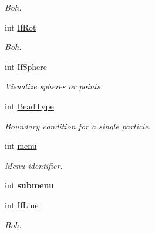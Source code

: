 \begin{DoxyCompactItemize}
\begin{DoxyCompactList}\small\item\em \-Boh. \end{DoxyCompactList}\item 
\hypertarget{classForces_a2c1a353b3d35ac1fdcc12aca81f6bb9d}{int \hyperlink{classForces_a2c1a353b3d35ac1fdcc12aca81f6bb9d}{\-If\-Rot}}\label{classForces_a2c1a353b3d35ac1fdcc12aca81f6bb9d}

\begin{DoxyCompactList}\small\item\em \-Boh. \end{DoxyCompactList}\item 
\hypertarget{classForces_a49498134a2a543fdb43ec67e5dca8e37}{int \hyperlink{classForces_a49498134a2a543fdb43ec67e5dca8e37}{\-If\-Sphere}}\label{classForces_a49498134a2a543fdb43ec67e5dca8e37}

\begin{DoxyCompactList}\small\item\em \-Visualize spheres or points. \end{DoxyCompactList}\item 
\hypertarget{classForces_a06476a36da66d85ccb8de14d0275474d}{int \hyperlink{classForces_a06476a36da66d85ccb8de14d0275474d}{\-Bead\-Type}}\label{classForces_a06476a36da66d85ccb8de14d0275474d}

\begin{DoxyCompactList}\small\item\em \-Boundary condition for a single particle. \end{DoxyCompactList}\item 
\hypertarget{classForces_a26b42906c0869d0cef7431a39a162950}{int \hyperlink{classForces_a26b42906c0869d0cef7431a39a162950}{menu}}\label{classForces_a26b42906c0869d0cef7431a39a162950}

\begin{DoxyCompactList}\small\item\em \-Menu identifier. \end{DoxyCompactList}\item 
\hypertarget{classForces_af6060165f2c5013a4339818e9c08833d}{int {\bfseries submenu}}\label{classForces_af6060165f2c5013a4339818e9c08833d}

\item 
\hypertarget{classForces_ac3e70209b515c8a6293fcdb019a2fb29}{int \hyperlink{classForces_ac3e70209b515c8a6293fcdb019a2fb29}{\-If\-Line}}\label{classForces_ac3e70209b515c8a6293fcdb019a2fb29}

\begin{DoxyCompactList}\small\item\em \-Boh. \end{DoxyCompactList}\end{DoxyCompactItemize}


